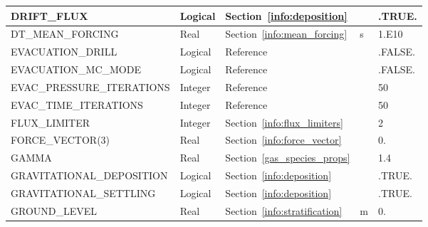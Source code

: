 \documentclass[11pt]{book}
\begin{document}
\begin{longtable}{@{\extracolsep{\fill}}|l|l|l|l|l|}
{\ct DRIFT\_FLUX}                               & Logical       & Section~\ref{info:deposition}                         &               & {\ct .TRUE.}      \\ \hline
{\ct DT\_MEAN\_FORCING}                         & Real          & Section~\ref{info:mean_forcing}                       & s             & 1.E10             \\ \hline
{\ct EVACUATION\_DRILL}                         & Logical       & Reference~\cite{FDS_Evac_Users_Guide}                 &               & {\ct .FALSE.}     \\ \hline
{\ct EVACUATION\_MC\_MODE}                      & Logical       & Reference~\cite{FDS_Evac_Users_Guide}                 &               & {\ct .FALSE.}     \\ \hline
{\ct EVAC\_PRESSURE\_ITERATIONS}                & Integer       & Reference~\cite{FDS_Evac_Users_Guide}                 &               & 50                \\ \hline
{\ct EVAC\_TIME\_ITERATIONS}                    & Integer       & Reference~\cite{FDS_Evac_Users_Guide}                 &               & 50                \\ \hline
{\ct FLUX\_LIMITER}                             & Integer       & Section~\ref{info:flux_limiters}                      &               & 2                 \\ \hline
{\ct FORCE\_VECTOR(3)}                          & Real          & Section~\ref{info:force_vector}                       &               & 0.                \\ \hline
{\ct GAMMA}                                     & Real          & Section~\ref{gas_species_props}                       &               & 1.4               \\ \hline
{\ct GRAVITATIONAL\_DEPOSITION}                 & Logical       & Section~\ref{info:deposition}                         &               & {\ct .TRUE.}      \\ \hline
{\ct GRAVITATIONAL\_SETTLING}                   & Logical       & Section~\ref{info:deposition}                         &               & {\ct .TRUE.}      \\ \hline
{\ct GROUND\_LEVEL}                             & Real          & Section~\ref{info:stratification}                     & m             & 0.                \\ \hline

\end{longtable}
\end{document}
